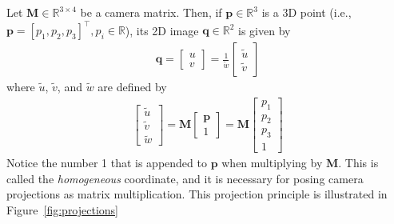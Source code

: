 \documentclass[10pt]{article}
\begin{document}
Let $\mathbf{M} \in \mathbb{R}^{3 \times 4}$ be a camera matrix.  Then, if $\mathbf{p} \in \mathbb{R}^3$ is a 3D point (i.e., $\mathbf{p} = [p_1, p_2, p_3]^{\top}, p_i \in \mathbb{R}$), its 2D image $\mathbf{q} \in \mathbb{R}^2$ is given by
\begin{eqnarray}
\mathbf{q} = 
\begin{bmatrix}
u \\ v
\end{bmatrix}
= \frac{1}{\widetilde{w}}
\begin{bmatrix}
\widetilde{u} \\ \widetilde{v}
\end{bmatrix}
\label{eqn:q}
\end{eqnarray}
where $\widetilde{u}$, $\widetilde{v}$, and $\widetilde{w}$ are defined by
\begin{eqnarray}
\begin{bmatrix}
\widetilde{u} \\ \widetilde{v} \\ \widetilde{w}
\end{bmatrix}
= \mathbf{M}
\begin{bmatrix}
\mathbf{p} \\ 1
\end{bmatrix}
= \mathbf{M}
\begin{bmatrix}
p_1 \\ p_2 \\ p_3 \\ 1
\end{bmatrix}
\label{eqn:p-proj-to-q}
\end{eqnarray}
Notice the number 1 that is appended to $\mathbf{p}$ when multiplying by $\mathbf{M}$.  This is called the {\em homogeneous} coordinate, and it is necessary for posing camera projections as matrix multiplication.  This projection principle is illustrated in Figure~\ref{fig:projections}
\end{document}
